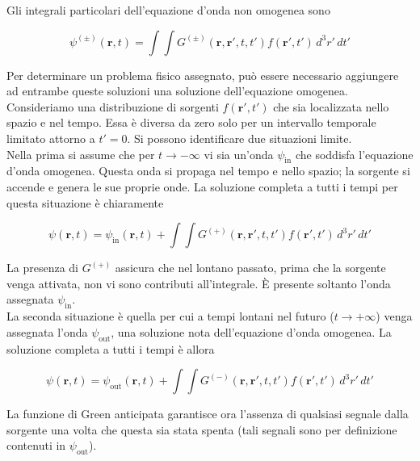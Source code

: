 Gli integrali particolari dell'equazione d'onda non omogenea sono

\begin{equation}
    \psi^{(\pm)}(\mathbf{r}, t) = \int \int G^{(\pm)}(\mathbf{r}, \mathbf{r'}, t, t') f(\mathbf{r'}, t') \, d^3r' \, dt'
\end{equation}

Per determinare un problema fisico assegnato, può essere necessario aggiungere ad entrambe queste soluzioni una soluzione dell'equazione omogenea. Consideriamo una distribuzione di sorgenti $f(\mathbf{r'}, t')$ che sia localizzata nello spazio e nel tempo. Essa è diversa da zero solo per un intervallo temporale limitato attorno a $t' = 0$. Si possono identificare due situazioni limite. \\

Nella prima si assume che per $t \to -\infty$ vi sia un'onda $\psi_{\text{in}}$ che soddisfa l'equazione d'onda omogenea. Questa onda si propaga nel tempo e nello spazio; la sorgente si accende e genera le sue proprie onde. La soluzione completa a tutti i tempi per questa situazione è chiaramente

\begin{equation}
    \psi(\mathbf{r}, t) = \psi_{\text{in}}(\mathbf{r}, t) + \int \int G^{(+)}(\mathbf{r}, \mathbf{r'}, t, t') f(\mathbf{r'}, t') \, d^3r' \, dt'
\end{equation}

La presenza di $G^{(+)}$ assicura che nel lontano passato, prima che la sorgente venga attivata, non vi sono contributi all'integrale. È presente soltanto l'onda assegnata $\psi_{\text{in}}$. \\

La seconda situazione è quella per cui a tempi lontani nel futuro ($t \to +\infty$) venga assegnata l'onda $\psi_{\text{out}}$, una soluzione nota dell'equazione d'onda omogenea. La soluzione completa a tutti i tempi è allora

\begin{equation}
    \psi(\mathbf{r}, t) = \psi_{\text{out}}(\mathbf{r}, t) + \int \int G^{(-)}(\mathbf{r}, \mathbf{r'}, t, t') f(\mathbf{r'}, t') \, d^3r' \, dt'
\end{equation}

La funzione di Green anticipata garantisce ora l'assenza di qualsiasi segnale dalla sorgente una volta che questa sia stata spenta (tali segnali sono per definizione contenuti in $\psi_{\text{out}}$). \\

